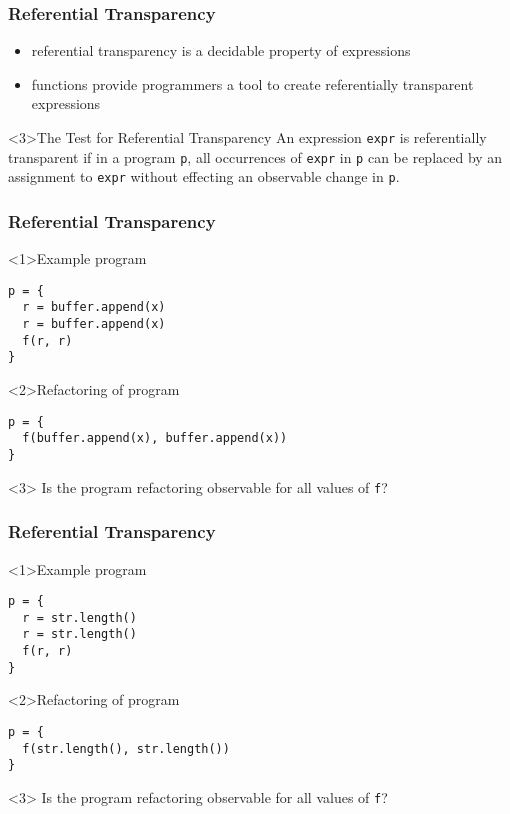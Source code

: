 \begin{frame}
\frametitle{Referential Transparency}
\begin{itemize}
  \item<1-> referential transparency is a decidable property of expressions
  \item<2-> functions provide programmers a tool to create referentially transparent expressions
\end{itemize}
\begin{block}<3>{The Test for Referential Transparency}
An expression \lstinline$expr$ is referentially transparent if in a program \lstinline$p$, all occurrences of \lstinline$expr$ in \lstinline$p$ can be replaced by an assignment to \lstinline$expr$ without effecting an observable change in \lstinline$p$.
\end{block}
\end{frame}

\begin{frame}[fragile]
\frametitle{Referential Transparency}
\begin{block}<1>{Example program}
\begin{lstlisting}
p = {
  r = buffer.append(x)
  r = buffer.append(x)
  f(r, r)
}
\end{lstlisting}
\end{block}
\begin{block}<2>{Refactoring of program}
\begin{lstlisting}
p = {
  f(buffer.append(x), buffer.append(x))
}
\end{lstlisting}
\end{block}
\begin{block}<3>{}
Is the program refactoring observable for all values of \lstinline$f$?
\end{block}
\end{frame}

\begin{frame}[fragile]
\frametitle{Referential Transparency}
\begin{block}<1>{Example program}
\begin{lstlisting}
p = {
  r = str.length()
  r = str.length()
  f(r, r)
}
\end{lstlisting}
\end{block}
\begin{block}<2>{Refactoring of program}
\begin{lstlisting}
p = {
  f(str.length(), str.length())
}
\end{lstlisting}
\end{block}
\begin{block}<3>{}
Is the program refactoring observable for all values of \lstinline$f$?
\end{block}
\end{frame}

